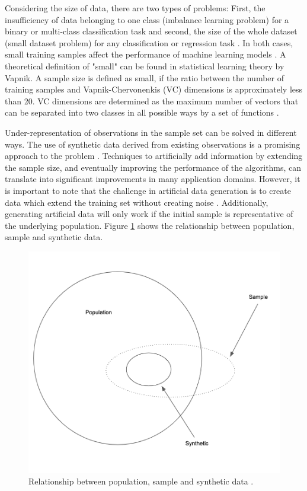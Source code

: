 \documentclass[parskip=full]{scrartcl}
\begin{document}
Considering the size of data, there are two types of problems: First, the
insufficiency of data belonging to one class (imbalance learning problem) for a
binary or multi-class classification task and second, the size of the whole
dataset (small dataset problem) for any classification or regression task
\cite{Sezer.2014}. In both cases, small training samples affect the performance
of machine learning models \cite{Tsai.2008}. A theoretical definition of "small"
can be found in statistical learning theory by Vapnik. A sample size is defined
as small, if the ratio between the number of training samples and
Vapnik-Chervonenkis (VC) dimensions is approximately less than 20. VC dimensions
are determined as the maximum number of vectors that can be separated into two
classes in all possible ways by a set of functions \cite{Vapnik.2008}.

Under-representation of observations in the sample set can be solved in
different ways. The use of synthetic data derived from existing observations is
a promising approach to the problem \cite{Sezer.2014}. Techniques to
artificially add information by extending the sample size, and eventually
improving the performance of the algorithms, can translate into significant
improvements in many application domains. However, it is important to note that
the challenge in artificial data generation is to create data which extend the
training set without creating noise \cite{Li.2006}. Additionally, generating
artificial data will only work if the initial sample is representative of the
underlying population. Figure \ref{fig:relationship} shows the relationship
between population, sample and synthetic data.

\begin{figure}[H]
	\centering
	\includegraphics[width=0.60\linewidth]{../analysis/relationship.png}
	\caption{Relationship between population, sample and synthetic data \cite{Li.2006}.}
	\label{fig:relationship}
\end{figure}
\end{document}
